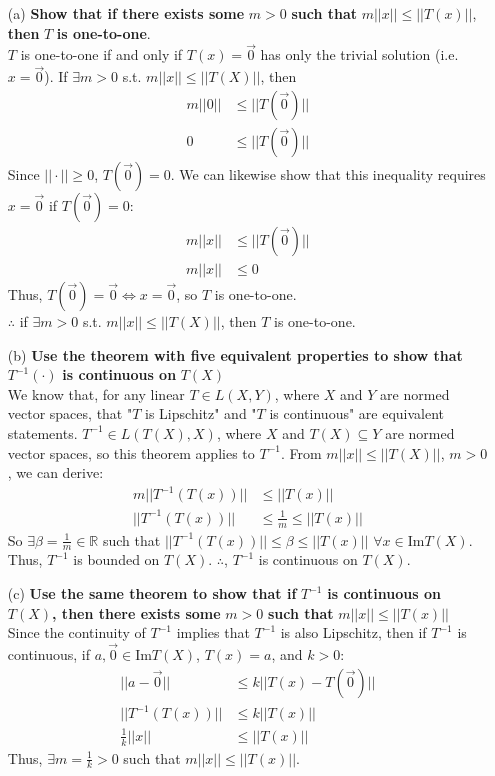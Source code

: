 \documentclass{article}
\newcommand{\R}{\mathbb{R}}
\newcommand{\inv}{^{-1}}
\begin{document}
\begin{itemize}
	\item[(a)] \textbf{Show that if there exists some} $m>0$ \textbf{such that} $m||x||\leq||T(x)||$, \textbf{then} $T$ \textbf{is one-to-one}.
		\medskip \\
		$T$ is one-to-one if and only if $T(x)=\vec{0}$ has only the trivial solution (i.e. $x=\vec{0}$). If $\exists m>0$ s.t. $m||x||\leq||T(X)||$, then 
		\begin{align*}
			m||0||&\leq||T(\vec{0})|| \\
			0&\leq||T(\vec{0})||
		\end{align*}
		Since $||\cdot||\geq 0$, $T(\vec{0})=0$. We can likewise show that this inequality requires $x=\vec{0}$ if $T(\vec{0})=0$:
		\begin{align*}
			m||x||&\leq||T(\vec{0})|| \\
			m||x||&\leq 0
		\end{align*}
		Thus, $T(\vec{0})=\vec{0}\iff x=\vec{0}$, so $T$ is one-to-one.
		\smallskip \\ 
		$\therefore$ if $\exists m>0$ s.t. $m||x||\leq||T(X)||$, then $T$ is one-to-one.
		
	\item[(b)] \textbf{Use the theorem with five equivalent properties to show that} $T^{-1}(\cdot)$ \textbf{is continuous on} $T(X)$
		\medskip \\
		We know that, for any linear $T\in L(X,Y)$, where $X$ and $Y$ are normed vector spaces, that "$T$ is Lipschitz" and "$T$ is continuous" are equivalent statements. $T^{-1}\in L(T(X),X)$, where $X$ and $T(X)\subseteq Y$ are normed vector spaces, so this theorem applies to $T^{-1}$. From $m||x||\leq||T(X)||$, $m>0$, we can derive:
		\begin{align*}
			m||T\inv(T(x))||&\leq||T(x)||									\\
			||T\inv(T(x))||&\leq\frac{1}{m}\leq||T(x)||
		\end{align*}
		So $\exists\beta=\frac{1}{m}\in\R$ such that $||T\inv(T(x))||\leq\beta\leq||T(x)||$ $\forall x\in\text{Im}T(X)$. Thus, $T\inv$ is bounded on $T(X)$. $\therefore$, $T\inv$ is continuous on $T(X)$.
		
	\item[(c)] \textbf{Use the same theorem to show that if} $T\inv$ \textbf{is continuous on} $T(X)$\textbf{, then there exists some} $m>0$ \textbf{such that} $m||x||\leq||T(x)||$
		\medskip \\
		Since the continuity of $T\inv$ implies that $T\inv$ is also Lipschitz, then if $T\inv$ is continuous, if $a,\vec{0}\in\text{Im}T(X)$, $T(x)=a$, and $k>0$:
		\begin{align*}
			||a-\vec{0}||&\leq k||T(x)-T(\vec{0})||	\\
			||T\inv(T(x))||&\leq k||T(x)|| \\
			\frac{1}{k}||x||&\leq||T(x)||
		\end{align*}
		Thus, $\exists m=\frac{1}{k}>0$ such that $m||x||\leq||T(x)||$.
\end{itemize}
\end{document}
